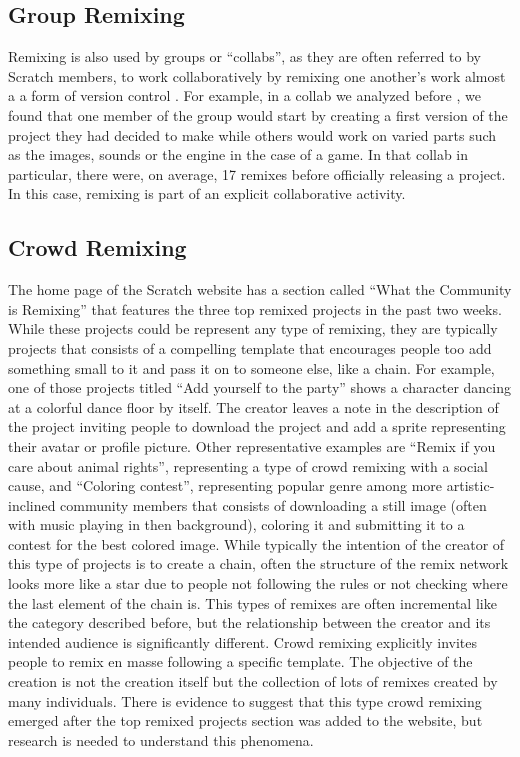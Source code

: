 \subsection{Group Remixing}
Remixing is also used by groups or ``collabs'', as they are often referred to by Scratch members, to work collaboratively by remixing one another's work almost a a form of version control \citep{tichy_rcs_1985}.
For example, in a collab we analyzed before \citep{aragon_tale_2009}, we found that one member of the group would start by creating a first version of the project they had decided to make while others would work on varied parts such as the images, sounds or the engine in the case of a game.
In that collab in particular, there were, on average, 17 remixes before officially releasing a project.
In this case, remixing is part of an explicit collaborative activity.


\subsection{Crowd Remixing}
The home page of the Scratch website has a section called ``What the Community is Remixing''  that features the three top remixed projects in the past two weeks.
While these projects could be represent any type of remixing, they are typically projects that consists of a compelling template that encourages people too add something small to it and pass it on to someone else, like a chain.
For example, one of those projects titled ``Add yourself to the party'' shows a character dancing at a colorful dance floor by itself.
The creator leaves a note in the description of the project inviting people to download the project and add a sprite representing their avatar or profile picture.
Other representative examples are ``Remix if you care about animal rights'', representing a type of crowd remixing with a social cause, and ``Coloring contest'', representing popular genre among more artistic-inclined community members that consists of downloading a still image (often with music playing in then background), coloring it and submitting it to a contest for the best colored image.
While typically the intention of the creator of this type of projects is to create a chain, often the structure of the remix network looks more like a star due to people not following the rules or not checking where the last element of the chain is.
This types of remixes are often incremental like the category described before, but the relationship between the creator and its intended audience is significantly different. 
Crowd remixing explicitly invites people to remix en masse following a specific template. 
The objective of the creation is not the creation itself but the collection of lots of remixes created by many individuals.
There is evidence to suggest that this type crowd remixing emerged after the top remixed projects section was added to the website, but research is needed to understand this phenomena.

